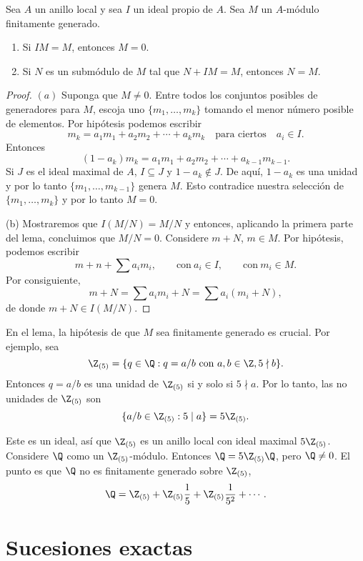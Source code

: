 \begin{lemma}[Nakayama]
  Sea $A$ un anillo local y sea $I$ un ideal propio de $A$. Sea $M$ un $A$-módulo finitamente generado.
  \begin{enumerate}
    \item Si $IM = M$, entonces $M = 0$.
    \item Si $N$ es un submódulo de $M$ tal que $N+IM = M$, entonces $N = M$.
  \end{enumerate}
\end{lemma}
\begin{proof}
  $(a)$ Suponga que $M \neq 0$. Entre todos los conjuntos posibles de generadores para $M$, escoja uno $\{m_1,\ldots,m_k\}$ tomando el menor número posible de elementos. Por hipótesis podemos escribir
  \[
    m_k = a_1 m_1 + a_2 m_2 + \cdots + a_k m_k
      \quad\text{para ciertos}\quad a_i \in I.
  \]
  Entonces
  \[
    (1-a_k)m_k = a_1 m_1 + a_2 m_2 + \cdots + a_{k-1} m_{k-1}.
  \]
  Si $J$ es el ideal maximal de $A$, $I \subseteq J$ y $1-a_k \notin J$. De aquí, $1-a_k$ es una unidad y por lo tanto $\{m_1,\ldots,m_{k-1}\}$ genera $M$. Esto contradice nuestra selección de $\{m_1,\ldots,m_k\}$ y por lo tanto $M = 0$.

  (b) Mostraremos que $I(M/N) = M/N$ y entonces, aplicando la primera parte del lema, concluimos que $M/N = 0$. Considere $m+N$, $m \in M$. Por hipótesis, podemos escribir
  \[
    m + n + \sum a_i m_i,
      \qquad \text{con}\ a_i \in I,
      \qquad \text{con}\ m_i \in M.
  \]
  Por consiguiente,
  \[
    m+N = \sum a_i m_i + N = \sum a_i (m_i + N),
  \]
  de donde $m + N \in I(M/N)$.
\end{proof}

En el lema, la hipótesis de que $M$ sea finitamente generado es crucial. Por ejemplo, sea
\[
  \Z_{(5)} = \{q \in \Q : q = a/b \ \text{con}\ a,b \in \Z, 5 \nmid b\}.
\]
Entonces $q = a/b$ es una unidad de $\Z_{(5)}$ si y solo si $5 \nmid a$. Por lo tanto, las no unidades de $\Z_{(5)}$ son
\[
  \{ a/b \in \Z_{(5)} : 5 \mid a \} = 5\Z_{(5)}.
\]

Este es un ideal, así que $\Z_{(5)}$ es un anillo local con ideal maximal $5\Z_{(5)}$. Considere $\Q$ como un $\Z_{(5)}$-módulo. Entonces $\Q = 5\Z_{(5)}\Q$, pero $\Q \neq 0$. El punto es que $\Q$ no es finitamente generado sobre $\Z_{(5)}$,
\[
  \Q = \Z_{(5)} + \Z_{(5)} \frac{1}{5} + \Z_{(5)}\frac{1}{5^2} + \cdots .
\]




\section{Sucesiones exactas}

